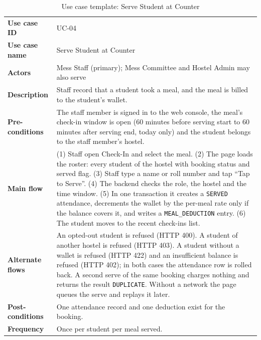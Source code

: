 \documentclass[11pt,a4paper]{article}
\begin{document}
\begin{table}[H]
\centering
\caption{Use case template: Serve Student at Counter}
\label{tab:uc4}
\begin{tabular}{@{}L{3.1cm}L{11.7cm}@{}}
\toprule
\textbf{Use case ID} & UC-04\\
\textbf{Use case name} & Serve Student at Counter\\
\textbf{Actors} & Mess Staff (primary); Mess Committee and Hostel Admin may
also serve\\
\textbf{Description} & Staff record that a student took a meal, and the meal is
billed to the student's wallet.\\
\textbf{Pre-conditions} & The staff member is signed in to the web console, the
meal's check-in window is open (60 minutes before serving start to 60 minutes
after serving end, today only) and the student belongs to the staff member's
hostel.\\
\textbf{Main flow} & (1) Staff open Check-In and select the meal. (2) The page
loads the roster: every student of the hostel with booking status and served
flag. (3) Staff type a name or roll number and tap ``Tap to Serve''. (4) The
backend checks the role, the hostel and the time window. (5) In one transaction
it creates a \texttt{SERVED} attendance, decrements the wallet by the per-meal
rate only if the balance covers it, and writes a \texttt{MEAL\_DEDUCTION}
entry. (6) The student moves to the recent check-ins list.\\
\textbf{Alternate flows} & An opted-out student is refused (HTTP 400). A student
of another hostel is refused (HTTP 403). A student without a wallet is refused
(HTTP 422) and an insufficient balance is refused (HTTP 402); in both cases the
attendance row is rolled back. A second serve of the same booking charges
nothing and returns the result \texttt{DUPLICATE}. Without a network the page
queues the serve and replays it later.\\
\textbf{Post-conditions} & One attendance record and one deduction exist for the
booking.\\
\textbf{Frequency} & Once per student per meal served.\\
\bottomrule
\end{tabular}
\end{table}
\end{document}
